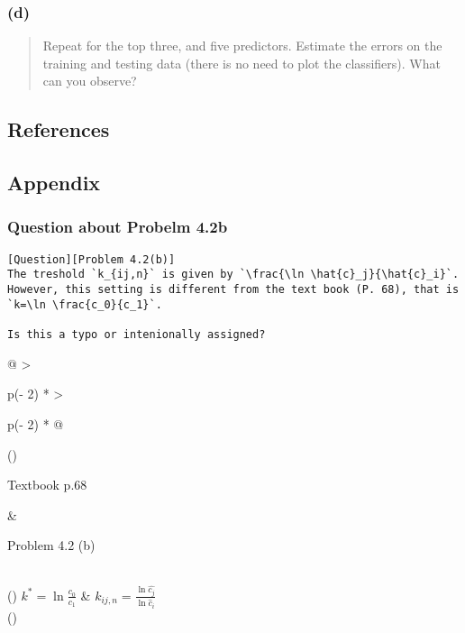 \documentclass[
  letterpaper,
  DIV=11,
  numbers=noendperiod]{scrartcl}
\begin{document}
\hypertarget{d}{%
\subsubsection{(d)}\label{d}}

\begin{quote}
Repeat for the top three, and five predictors. Estimate the errors on
the training and testing data (there is no need to plot the
classifiers). What can you observe?
\end{quote}

\hypertarget{references}{%
\subsection{References}\label{references}}

\hypertarget{appendix}{%
\subsection{Appendix}\label{appendix}}

\hypertarget{question-about-probelm-4.2b}{%
\subsubsection{Question about Probelm
4.2b}\label{question-about-probelm-4.2b}}

\begin{verbatim}
[Question][Problem 4.2(b)]
The treshold `k_{ij,n}` is given by `\frac{\ln \hat{c}_j}{\hat{c}_i}`. However, this setting is different from the text book (P. 68), that is `k=\ln \frac{c_0}{c_1}`. 

Is this a typo or intenionally assigned?
\end{verbatim}

\begin{longtable}[]{@{}
  >{\raggedright\arraybackslash}p{(\columnwidth - 2\tabcolsep) * }
  >{\raggedright\arraybackslash}p{(\columnwidth - 2\tabcolsep) * }@{}}
\toprule()
\begin{minipage}[b]{\linewidth}\raggedright
Textbook p.68
\end{minipage} & \begin{minipage}[b]{\linewidth}\raggedright
Problem 4.2 (b)
\end{minipage} \\
\midrule()
\endhead
\(k^{*}=\ln\frac{c_0}{c_1}\) &
\(k_{ij,n}=\frac{\ln\hat{c_j}}{\ln \hat{c}_i}\) \\
\bottomrule()
\end{longtable}
\end{document}
